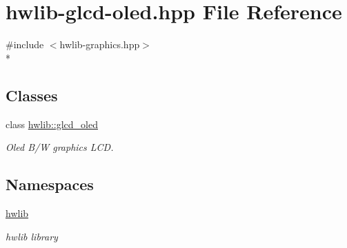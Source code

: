 \hypertarget{hwlib-glcd-oled_8hpp}{}\section{hwlib-\/glcd-\/oled.hpp File Reference}
\label{hwlib-glcd-oled_8hpp}
{\ttfamily \#include $<$hwlib-\/graphics.\+hpp$>$}\\*
\subsection*{Classes}
\begin{DoxyCompactItemize}
\item 
class \hyperlink{classhwlib_1_1glcd__oled}{hwlib\+::glcd\+\_\+oled}
\begin{DoxyCompactList}\small\item\em Oled B/W graphics L\+CD. \end{DoxyCompactList}\end{DoxyCompactItemize}
\subsection*{Namespaces}
\begin{DoxyCompactItemize}
\item 
 \hyperlink{namespacehwlib}{hwlib}
\begin{DoxyCompactList}\small\item\em hwlib library \end{DoxyCompactList}\end{DoxyCompactItemize}
